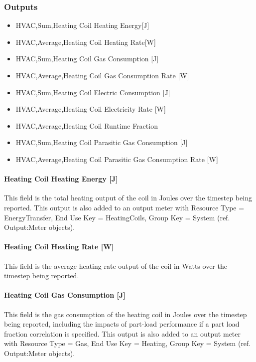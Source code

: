 \subsubsection{Outputs}\label{outputs-10-002}

\begin{itemize}
\item
  HVAC,Sum,Heating Coil Heating Energy{[}J{]}
\item
  HVAC,Average,Heating Coil Heating Rate{[}W{]}
\item
  HVAC,Sum,Heating Coil Gas Consumption {[}J{]}
\item
  HVAC,Average,Heating Coil Gas Consumption Rate {[}W{]}
\item
  HVAC,Sum,Heating Coil Electric Consumption {[}J{]}
\item
  HVAC,Average,Heating Coil Electricity Rate {[}W{]}
\item
  HVAC,Average,Heating Coil Runtime Fraction
\item
  HVAC,Sum,Heating Coil Parasitic Gas Consumption {[}J{]}
\item
  HVAC,Average,Heating Coil Parasitic Gas Consumption Rate {[}W{]}
\end{itemize}

\paragraph{Heating Coil Heating Energy {[}J{]}}\label{heating-coil-energy-j-1}

This field is the total heating output of the coil in Joules over the timestep being reported. This output is also added to an output meter with Resource Type = EnergyTransfer, End Use Key = HeatingCoils, Group Key = System (ref. Output:Meter objects).

\paragraph{Heating Coil Heating Rate {[}W{]}}\label{heating-coil-rate-w}

This field is the average heating rate output of the coil in Watts over the timestep being reported.

\paragraph{Heating Coil Gas Consumption {[}J{]}}\label{heating-coil-gas-consumption-j}

This field is the gas consumption of the heating coil in Joules over the timestep being reported, including the impacts of part-load performance if a part load fraction correlation is specified. This output is also added to an output meter with Resource Type = Gas, End Use Key = Heating, Group Key = System (ref. Output:Meter objects).

